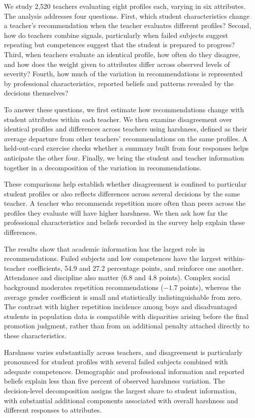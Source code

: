 We study 2,520 teachers evaluating eight profiles each, varying in six attributes. The analysis addresses four questions. First, which student characteristics change a teacher's recommendation when the teacher evaluates different profiles? Second, how do teachers combine signals, particularly when failed subjects suggest repeating but competences suggest that the student is prepared to progress? Third, when teachers evaluate an identical profile, how often do they disagree, and how does the weight given to attributes differ across observed levels of severity? Fourth, how much of the variation in recommendations is represented by professional characteristics, reported beliefs and patterns revealed by the decisions themselves?

To answer these questions, we first estimate how recommendations change with student attributes within each teacher. We then examine disagreement over identical profiles and differences across teachers using harshness, defined as their average departure from other teachers' recommendations on the same profiles. A held-out-card exercise checks whether a summary built from four responses helps anticipate the other four. Finally, we bring the student and teacher information together in a decomposition of the variation in recommendations.

These comparisons help establish whether disagreement is confined to particular student profiles or also reflects differences across several decisions by the same teacher. A teacher who recommends repetition more often than peers across the profiles they evaluate will have higher harshness. We then ask how far the professional characteristics and beliefs recorded in the survey help explain these differences.

The results show that academic information has the largest role in recommendations. Failed subjects and low competences have the largest within-teacher coefficients, 54.9 and 27.2 percentage points, and reinforce one another. Attendance and discipline also matter (6.8 and 4.8 points). Complex social background moderates repetition recommendations ($-1.7$ points), whereas the average gender coefficient is small and statistically indistinguishable from zero. The contrast with higher repetition incidence among boys and disadvantaged students in population data \citep{oecd} is compatible with disparities arising before the final promotion judgment, rather than from an additional penalty attached directly to these characteristics.

Harshness varies substantially across teachers, and disagreement is particularly pronounced for student profiles with several failed subjects combined with adequate competences. Demographic and professional information and reported beliefs explain less than five percent of observed harshness variation. The decision-level decomposition assigns the largest share to student information, with substantial additional components associated with overall harshness and different responses to attributes.

